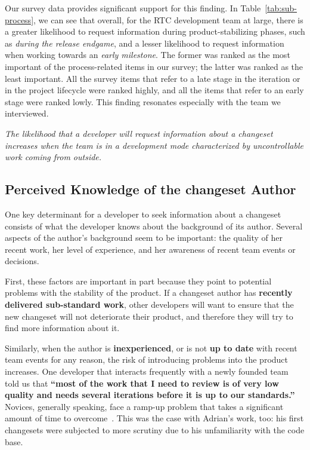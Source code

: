 \documentclass{sig-alternate}
\newenvironment{note}%
{\medskip
\noindent
\vspace{2pt}
\let\emph=\textbf
\begin{boxedminipage}{.99\columnwidth}\em}%
{\end{boxedminipage}}
\begin{document}
Our survey data provides significant support for this finding. In Table~\ref{tab:sub-process}, we can see that overall, for the RTC development team at large, there is a greater likelihood to request information during product-stabilizing phases, such as 
\emph{during the release endgame}, and a lesser likelihood to request information when working towards an \emph{early milestone}. The former was ranked as the most important of the process-related items in our survey; the latter was ranked as the least important. All the survey items that refer to a late stage in the iteration or in the project lifecycle were ranked highly, and all the items that refer to an early stage were ranked lowly. This finding resonates especially with the team we interviewed. 

\begin{note}
The likelihood that a developer will request information about a changeset increases when the team is in a development mode characterized by uncontrollable work coming from outside.
\end{note}



\subsection{Perceived Knowledge of the changeset Author}

One key determinant for a developer to seek information about a changeset consists of what the developer knows about the background of its author. Several aspects of the author's background seem to be important: the quality of her recent work, her level of experience, and her awareness of recent team events or decisions.

First, these factors are important in part because they point to potential problems with the stability of the product. If a changeset author has \emph{recently delivered sub-standard work}, other developers will want to ensure that the new changeset will not deteriorate their product, and therefore they will try to find more information about it.

Similarly, when the author is \emph{inexperienced}, or is not \emph{up to date} with recent team events for any reason, the risk of introducing problems into the product increases. One developer that interacts frequently with a newly founded team told us that \emph{``most of the work that I need to review is of very low quality and needs several iterations before it is up to our standards.''} Novices, generally speaking, face a ramp-up problem that takes a significant amount of time to overcome~\cite{begel:sigcse:2008}. This was the case with Adrian's work, too: his first changesets were subjected to more scrutiny due to his unfamiliarity with the code base.
\end{document}
